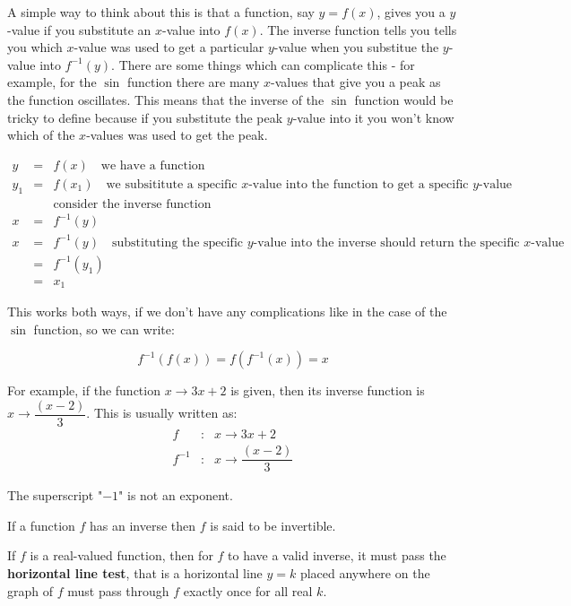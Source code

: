 A simple way to think about this is that a function, say $y=f(x)$, gives you a $y$-value if you substitute an $x$-value into $f(x)$. The inverse function tells you tells you which $x$-value was used to get a particular $y$-value when you substitue the $y$-value into $f^{-1}(y)$. There are some things which can complicate this - for example, for the $\sin$ function there are many $x$-values that give you a peak as the function oscillates. This means that the inverse of the $\sin$ function would be tricky to define because if you substitute the peak $y$-value into it you won't know which of the $x$-values was used to get the peak.

\begin{eqnarray*}
 y&=&f(x) \quad \mbox{we have a function} \\
 y_1 &=& f(x_1) \quad \mbox{we subsititute a specific $x$-value into the function to get a specific $y$-value}\\
 &&\mbox{consider the inverse function}\\
 x&=&f^{-1}(y)\\
 x&=&f^{-1}(y)\quad\mbox{substituting the specific $y$-value into the inverse should return the specific $x$-value}\\
 &=&f^{-1}(y_1)\\
  &=&x_1
\end{eqnarray*}

This works both ways, if we don't have any complications like in the case of the $\sin$ function, so we can write:

\begin{equation}
f^{-1}(f(x))=f(f^{-1}(x))=x
\end{equation}

For example, if the function $x \rightarrow 3x + 2$ is given, then its inverse function is $x \rightarrow \dfrac{(x-2)}{3}$. This is usually written as:
\begin{eqnarray}
f &\colon& x \to 3x+2\\
f^{-1} &\colon& x \to \dfrac{(x-2)}{3}
\end{eqnarray}

The superscript "$-1$" is not an exponent. 

If a function $f$ has an inverse then $f$ is said to be invertible.

If $f$ is a real-valued function, then for $f$ to have a valid inverse, it must pass the \textbf{horizontal line test}, that is a horizontal line $y = k$ placed anywhere on the graph of $f$ must pass through $f$ exactly once for all real $k$.

